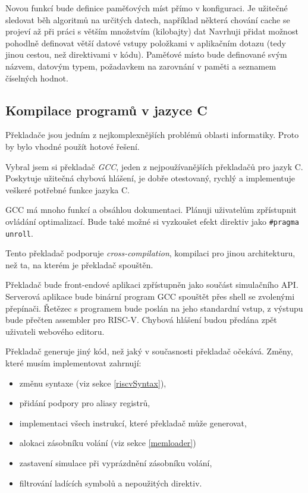 Novou funkcí bude definice paměťových míst přímo v konfiguraci.
Je užitečné sledovat běh algoritmů na určitých datech, například některá chování cache se projeví až při práci s větším množstvím (kilobajty) dat
Navrhuji přidat možnost pohodlně definovat větší datové vstupy položkami v aplikačním dotazu (tedy jinou cestou, než direktivami v kódu).
Paměťové místo bude definované svým názvem, datovým typem, požadavkem na zarovnání v paměti a seznamem číselných hodnot.

\subsection{Kompilace programů v jazyce C}

Překladače jsou jedním z nejkomplexnějších problémů oblasti informatiky.
Proto by bylo vhodné použít hotové řešení.

Vybral jsem si překladač \emph{GCC}, jeden z nejpoužívanějších překladačů pro jazyk C.
Poskytuje užitečná chybová hlášení, je dobře otestovaný, rychlý a implementuje veškeré potřebné funkce jazyka C.

GCC má mnoho funkcí a obsáhlou dokumentaci.
Plánuji uživatelům zpřístupnit ovládání optimalizací.
Bude také možné si vyzkoušet efekt direktiv jako \texttt{\#pragma unroll}. 

Tento překladač podporuje \emph{cross-compilation}, kompilaci pro jinou architekturu, než ta, na kterém je překladač spouštěn.

Překladač bude front-endové aplikaci zpřístupněn jako součást simulačního API. 
Serverová aplikace bude binární program GCC spouštět přes shell se zvolenými přepínači.
Řetězec s programem bude poslán na jeho standardní vstup, z výstupu bude přečten assembler pro RISC-V.
Chybová hlášení budou předána zpět uživateli webového editoru.

Překladač generuje jiný kód, než jaký v současnosti překladač očekává.
Změny, které musím implementovat zahrnují:
\begin{itemize}
    \item změnu syntaxe (viz sekce \ref{riscvSyntax}),
    \item přidání podpory pro aliasy registrů,
    \item implementaci všech instrukcí, které překladač může generovat,
    \item alokaci zásobníku volání (viz sekce \ref{memloader})
    \item zastavení simulace při vyprázdnění zásobníku volání,
    \item filtrování ladících symbolů a nepoužitých direktiv.
\end{itemize}

